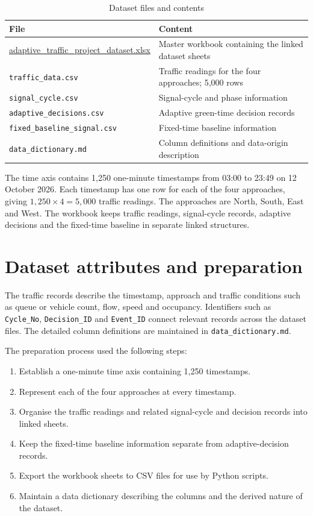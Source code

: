 \documentclass[12pt,a4paper,oneside]{report}
\begin{document}
\begin{table}[htbp]\centering\small
\caption{Dataset files and contents}\label{tab:dataset-files}
\begin{tabular}{|p{}|p{}|}\hline
\textbf{File} & \textbf{Content} \\\hline
\url{adaptive_traffic_project_dataset.xlsx} & Master workbook containing the linked dataset sheets \\\hline
\texttt{traffic\_data.csv} & Traffic readings for the four approaches; 5,000 rows \\\hline
\texttt{signal\_cycle.csv} & Signal-cycle and phase information \\\hline
\texttt{adaptive\_decisions.csv} & Adaptive green-time decision records \\\hline
\texttt{fixed\_baseline\_signal.csv} & Fixed-time baseline information \\\hline
\texttt{data\_dictionary.md} & Column definitions and data-origin description \\\hline
\end{tabular}\end{table}

The time axis contains 1,250 one-minute timestamps from 03:00 to 23:49 on 12 October 2026. Each timestamp has one row for each of the four approaches, giving $1{,}250 \times 4 = 5{,}000$ traffic readings. The approaches are North, South, East and West. The workbook keeps traffic readings, signal-cycle records, adaptive decisions and the fixed-time baseline in separate linked structures.

\section{Dataset attributes and preparation}
The traffic records describe the timestamp, approach and traffic conditions such as queue or vehicle count, flow, speed and occupancy. Identifiers such as \texttt{Cycle\_No}, \texttt{Decision\_ID} and \texttt{Event\_ID} connect relevant records across the dataset files. The detailed column definitions are maintained in \texttt{data\_dictionary.md}.

The preparation process used the following steps:
\begin{enumerate}
  \item Establish a one-minute time axis containing 1,250 timestamps.
  \item Represent each of the four approaches at every timestamp.
  \item Organise the traffic readings and related signal-cycle and decision records into linked sheets.
  \item Keep the fixed-time baseline information separate from adaptive-decision records.
  \item Export the workbook sheets to CSV files for use by Python scripts.
  \item Maintain a data dictionary describing the columns and the derived nature of the dataset.
\end{enumerate}
\end{document}
